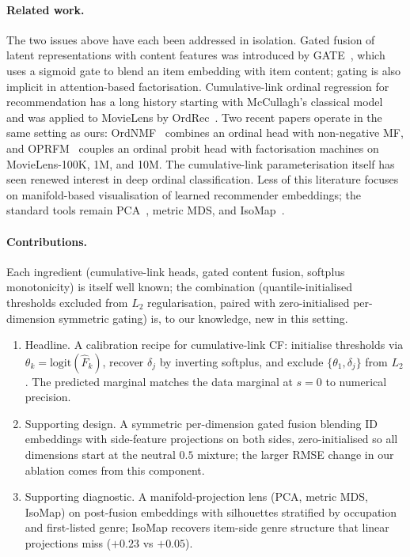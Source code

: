 \documentclass[a4paper]{article} %
\begin{document}
\paragraph{Related work.}
The two issues above have each been addressed in isolation.
Gated fusion of latent representations with content features was
introduced by GATE~\cite{ma2019gate}, which uses a sigmoid gate to blend an
item embedding with item content; gating is also implicit in attention-based
factorisation. Cumulative-link ordinal regression for recommendation has
a long history starting with McCullagh's classical model~\cite{mccullagh1980ordinal}
and was applied to MovieLens by OrdRec~\cite{koren2011ordrec}. Two recent
papers operate in the same setting as ours: OrdNMF~\cite{gouvert2020ordnmf}
combines an ordinal head with non-negative MF, and OPRFM~\cite{zaman2025oprfm}
couples an ordinal probit head with factorisation machines on MovieLens-100K,
1M, and 10M. The cumulative-link parameterisation itself has seen renewed
interest in deep ordinal classification. Less of this literature focuses on
manifold-based visualisation of learned recommender embeddings; the standard
tools remain PCA~\cite{jolliffe2002pca}, metric MDS, and
IsoMap~\cite{tenenbaum2000isomap}.

\paragraph{Contributions.} Each ingredient (cumulative-link heads, gated
content fusion, softplus monotonicity) is itself well known; the combination
(quantile-initialised thresholds excluded from $L_2$ regularisation, paired
with zero-initialised per-dimension symmetric gating) is, to our knowledge,
new in this setting.
\begin{enumerate}
\setlength{\itemsep}{1pt}
\item Headline. A calibration recipe for cumulative-link CF: initialise
thresholds via $\theta_k=\mathrm{logit}(\hat F_k)$, recover $\delta_j$ by
inverting softplus, and exclude $\{\theta_1,\delta_j\}$ from $L_2$. The
predicted marginal matches the data marginal at $s=0$ to numerical precision.
\item Supporting design. A symmetric per-dimension gated fusion blending ID
embeddings with side-feature projections on both sides, zero-initialised so
all dimensions start at the neutral $0.5$ mixture; the larger RMSE change in
our ablation comes from this component.
\item Supporting diagnostic. A manifold-projection lens (PCA, metric MDS, IsoMap) on
post-fusion embeddings with silhouettes stratified by occupation and first-listed
genre; IsoMap recovers item-side genre structure that linear projections miss
($+0.23$ vs $+0.05$).
\end{enumerate}
\end{document}
